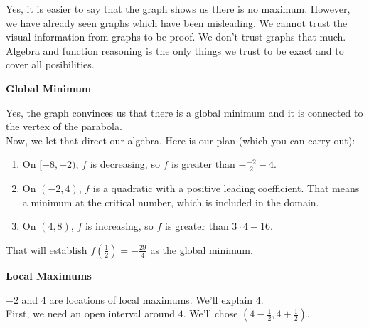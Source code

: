 \documentclass{ximera}
\begin{document}
\begin{exercise}
\begin{question}
\end{question}

\begin{warning}


Yes, it is easier to say that the graph shows us there is no maximum.  However, we have already seen graphs which have been misleading. We cannot trust the visual information from graphs to be proof.  We don't trust graphs that much.  Algebra and function reasoning is the only things we trust to be exact and to cover all posibilities.

\end{warning}






\begin{question} \textbf{Global Minimum} 


Yes, the graph convinces us that there is a global minimum and it is connected to the vertex of the parabola. \\


Now, we let that direct our algebra.  Here is our plan (which you can carry out):


\begin{enumerate}
\item On $[-8, -2)$, $f$ is decreasing, so $f$ is greater than $-\frac{-2}{2} - 4$.
\item On $(-2, 4)$, $f$ is a quadratic with a positive leading coefficient.  That means a minimum at the critical number, which is included in the domain.
\item On $(4, 8)$, $f$ is increasing, so $f$ is greater than $3 \cdot 4 - 16$.
\end{enumerate}

That will establish $f\left( \frac{1}{2} \right) = -\frac{29}{4}$ as the global minimum.

\end{question}










\begin{question} \textbf{Local Maximums} 

$-2$ and $4$ are locations of local maximums.  We'll explain $4$. \\


First, we need an open interval around $4$.  We'll chose $\left( 4-\frac{1}{2}, 4 + \frac{1}{2} \right)$.



\end{question}
\end{exercise}
\end{document}
